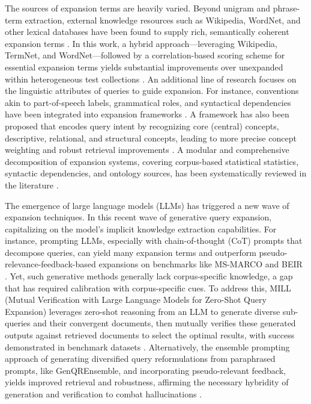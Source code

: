 \documentclass[11pt]{article}
\begin{document}
The sources of expansion terms are heavily varied. Beyond unigram and phrase-term extraction, external knowledge resources such as Wikipedia, WordNet, and other lexical databases have been found to supply rich, semantically coherent expansion terms \cite{ref26}. In this work, a hybrid approach---leveraging Wikipedia, TermNet, and WordNet---followed by a correlation-based scoring scheme for essential expansion terms yields substantial improvements over unexpanded within heterogeneous test collections \cite{ref26}. An additional line of research focuses on the linguistic attributes of queries to guide expansion. For instance, conventions akin to part-of-speech labels, grammatical roles, and syntactical dependencies have been integrated into expansion frameworks \cite{ref27}. A framework has also been proposed that encodes query intent by recognizing core (central) concepts, descriptive, relational, and structural concepts, leading to more precise concept weighting and robust retrieval improvements \cite{ref27}. A modular and comprehensive decomposition of expansion systems, covering corpus-based statistical statistics, syntactic dependencies, and ontology sources, has been systematically reviewed in the literature \cite{ref28}.

The emergence of large language models (LLMs) has triggered a new wave of expansion techniques. In this recent wave of generative query expansion, capitalizing on the model's implicit knowledge extraction capabilities. For instance, prompting LLMs, especially with chain-of-thought (CoT) prompts that decompose queries, can yield many expansion terms and outperform pseudo-relevance-feedback-based expansions on benchmarks like MS-MARCO and BEIR \cite{ref29}. Yet, such generative methods generally lack corpus-specific knowledge, a gap that has required calibration with corpus-specific cues. To address this, MILL (Mutual Verification with Large Language Models for Zero-Shot Query Expansion) leverages zero-shot reasoning from an LLM to generate diverse sub-queries and their convergent documents, then mutually verifies these generated outputs against retrieved documents to select the optimal results, with success demonstrated in benchmark datasets \cite{ref30}. Alternatively, the ensemble prompting approach of generating diversified query reformulations from paraphrased prompts, like GenQREnsemble, and incorporating pseudo-relevant feedback, yields improved retrieval and robustness, affirming the necessary hybridity of generation and verification to combat hallucinations \cite{ref31}.
\end{document}
